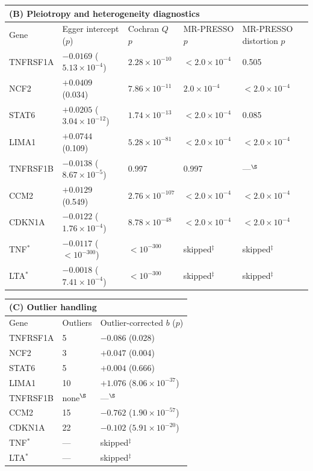 \begin{table}[htbp]
\begin{tabular}{lllll}
\toprule
\multicolumn{5}{l}{\textbf{(B)} Pleiotropy and heterogeneity diagnostics}\\
\midrule
  Gene & Egger intercept ($p$) & Cochran $Q$ $p$ & MR-PRESSO $p$ & MR-PRESSO distortion $p$ \\
\midrule
  TNFRSF1A  & $-0.0169$ ($5.13\times10^{-4}$)  & $2.28\times10^{-10}$  & $<2.0\times10^{-4}$ & 0.505 \\
  NCF2      & $+0.0409$ (0.034)                & $7.86\times10^{-11}$  & $2.0\times10^{-4}$ & $<2.0\times10^{-4}$ \\
  STAT6     & $+0.0205$ ($3.04\times10^{-12}$) & $1.74\times10^{-13}$  & $<2.0\times10^{-4}$ & 0.085 \\
  LIMA1     & $+0.0744$ (0.109)                & $5.28\times10^{-81}$  & $<2.0\times10^{-4}$ & $<2.0\times10^{-4}$ \\
  TNFRSF1B  & $-0.0138$ ($8.67\times10^{-5}$)  & 0.997                 & 0.997 & ---$^{\S}$ \\
  CCM2      & $+0.0129$ (0.549)                & $2.76\times10^{-107}$ & $<2.0\times10^{-4}$ & $<2.0\times10^{-4}$ \\
  CDKN1A    & $-0.0122$ ($1.76\times10^{-4}$)  & $8.78\times10^{-48}$  & $<2.0\times10^{-4}$ & $<2.0\times10^{-4}$ \\
  TNF$^{*}$ & $-0.0117$ ($<10^{-300}$)         & $<10^{-300}$          & skipped$^{\ddagger}$ & skipped$^{\ddagger}$ \\
  LTA$^{*}$ & $-0.0018$ ($7.41\times10^{-4}$)  & $<10^{-300}$          & skipped$^{\ddagger}$ & skipped$^{\ddagger}$ \\
\bottomrule
\end{tabular}

\vspace{1.4em}

\begin{tabular}{lll}
\toprule
\multicolumn{3}{l}{\textbf{(C)} Outlier handling}\\
\midrule
  Gene & Outliers & Outlier-corrected $b$ ($p$) \\
\midrule
  TNFRSF1A  & 5 & $-0.086$ (0.028) \\
  NCF2      & 3 & $+0.047$ (0.004) \\
  STAT6     & 5  & $+0.004$ (0.666) \\
  LIMA1     & 10 & $+1.076$ ($8.06\times10^{-37}$) \\
  TNFRSF1B  & none$^{\S}$ & ---$^{\S}$ \\
  CCM2      & 15 & $-0.762$ ($1.90\times10^{-57}$) \\
  CDKN1A    & 22 & $-0.102$ ($5.91\times10^{-20}$) \\
  TNF$^{*}$ & --- & skipped$^{\ddagger}$ \\
  LTA$^{*}$ & --- & skipped$^{\ddagger}$ \\
\bottomrule
\end{tabular}


\end{table}
